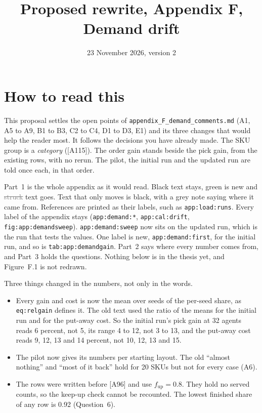 \documentclass[11pt,a4paper]{article}
\title{Proposed rewrite, Appendix F, Demand drift}
\date{23 November 2026, version 2}
\newcommand{\new}[1]{\textcolor{newc}{#1}}
\newcommand{\old}[1]{\textcolor{gray}{\sout{#1}}}
\newcommand{\lref}[1]{{\small\texttt{#1}}}
\begin{document}
\sloppy
\maketitle

\section*{How to read this}
This proposal settles the open points of
\texttt{appendix\_F\_demand\_comments.md} (A1, A5 to A9, B1 to B3, C2 to C4,
D1 to D3, E1) and its three changes that would help the reader most. It
follows the decisions you have already made. The SKU group is a
\emph{category} ([A115]). The order gain stands beside the pick gain, from
the existing rows, with no rerun. The pilot, the initial run and the updated
run are told once each, in that order.

Part~1 is the whole appendix as it would read. Black text stays,
\new{green} is new and \old{struck} text goes. Text that only moves is black,
with a grey note saying where it came from. References are printed as their
labels, such as \lref{app:load:runs}. Every label of the appendix stays
(\lref{app:demand:*}, \lref{app:cal:drift}, \lref{fig:app:demandsweep}).
\lref{app:demand:sweep} now sits on the updated run, which is the run that
tests the values. One label is new, \lref{app:demand:first}, for the initial
run, and so is \lref{tab:app:demandgain}. Part~2 says where every number comes
from, and Part~3 holds the questions. Nothing below is in the thesis yet, and
Figure~F.1 is not redrawn.

Three things changed in the numbers, not only in the words.
\begin{itemize}[nosep]
  \item Every gain and cost is now the mean over seeds of the per-seed share,
        as \lref{eq:relgain} defines it. The old text used the ratio of the
        means for the initial run and for the put-away cost. So the initial
        run's pick gain at 32 agents reads 6 percent, not 5, its range 4 to
        12, not 3 to 13, and the put-away cost reads 9, 12, 13 and 14
        percent, not 10, 12, 13 and 15.
  \item The pilot now gives its numbers per starting layout. The old ``almost
        nothing'' and ``most of it back'' hold for 20 SKUs but not for every
        case (A6).
  \item The rows were written before [A96] and use $f_{\mathrm{up}} = 0.8$.
        They hold no served counts, so the keep-up check cannot be recounted.
        The lowest finished share of any row is 0.92 (Question~6).
\end{itemize}
\end{document}
